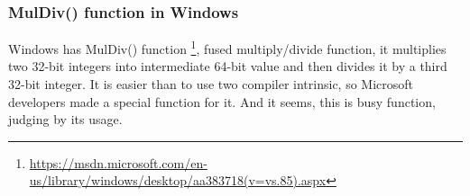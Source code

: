 \subsubsection{MulDiv() function in Windows}

Windows has MulDiv() function
\footnote{\url{https://msdn.microsoft.com/en-us/library/windows/desktop/aa383718(v=vs.85).aspx}},
fused multiply/divide function, it multiplies two 32-bit integers into intermediate 64-bit value
and then divides it by a third 32-bit integer.
It is easier than to use two compiler intrinsic, so Microsoft developers made a special function for it.
And it seems, this is busy function, judging by its usage.

